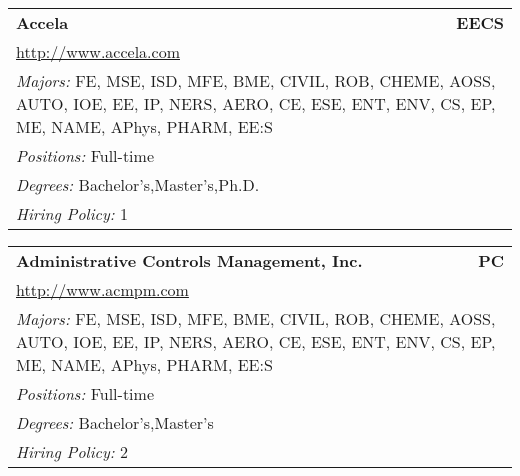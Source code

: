 \documentclass[twoside]{article}
\begin{document}
    \begin{center}\begin{multicols}{3}
    \begin{FlushLeft}
    \begin{minipage}{.9\columnwidth}\begin{tabularx}{.95\columnwidth}{Xr}
                 {\Large\bf Accela} & {\Large\bf EECS}\\
    \multicolumn{2}{p{.95\columnwidth}}{\url{http://www.accela.com}}\\
    \multicolumn{2}{p{.95\columnwidth}}{\emph{Majors:} FE, MSE, ISD, MFE, BME, CIVIL, ROB, CHEME, AOSS, AUTO, IOE, EE, IP, NERS, AERO, CE, ESE, ENT, ENV, CS, EP, ME, NAME, APhys, PHARM, EE:S}\\
    \multicolumn{2}{p{.95\columnwidth}}{\emph{Positions:} Full-time}\\
    \multicolumn{2}{p{.95\columnwidth}}{\emph{Degrees:} Bachelor's,Master's,Ph.D.}\\
    \multicolumn{2}{p{.95\columnwidth}}{\emph{Hiring Policy:} 1}\\
    \end{tabularx}
    
\end{minipage}
 
\begin{minipage}{.9\columnwidth}\begin{tabularx}{.95\columnwidth}{Xr}
                 {\Large\bf Administrative Controls Management, Inc.} & {\Large\bf PC}\\
    \multicolumn{2}{p{.95\columnwidth}}{\url{http://www.acmpm.com}}\\
    \multicolumn{2}{p{.95\columnwidth}}{\emph{Majors:} FE, MSE, ISD, MFE, BME, CIVIL, ROB, CHEME, AOSS, AUTO, IOE, EE, IP, NERS, AERO, CE, ESE, ENT, ENV, CS, EP, ME, NAME, APhys, PHARM, EE:S}\\
    \multicolumn{2}{p{.95\columnwidth}}{\emph{Positions:} Full-time}\\
    \multicolumn{2}{p{.95\columnwidth}}{\emph{Degrees:} Bachelor's,Master's}\\
    \multicolumn{2}{p{.95\columnwidth}}{\emph{Hiring Policy:} 2}\\
    \end{tabularx}
    
\end{minipage}
 

\end{FlushLeft}
\end{multicols}
\end{center}
\end{document}

